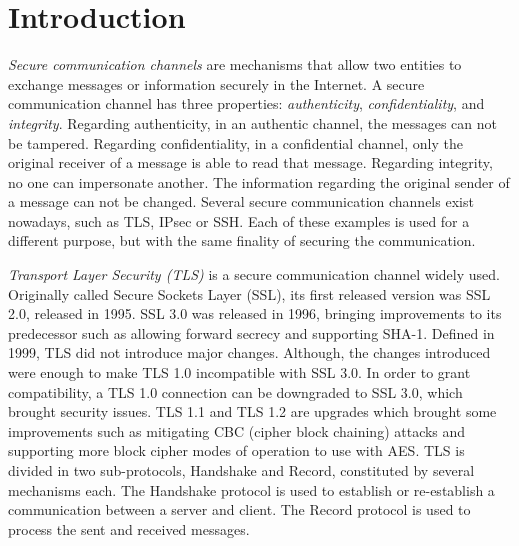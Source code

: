 \documentclass{sig-alternate-05-2015}
\begin{document}

%
%

%
%
\printccsdesc



\section{Introduction}

\textit{Secure communication channels} are mechanisms that allow two entities to exchange messages or information securely in the Internet.
A secure communication channel has three properties: \textit{authenticity}, \textit{confidentiality}, and \textit{integrity}. Regarding authenticity, in an authentic channel, the messages can not be tampered. Regarding confidentiality, in a confidential channel, only the original receiver of a message is able to read that message. Regarding integrity, no one can impersonate another. The information regarding the original sender of a message can not be changed.
Several secure communication channels exist nowadays, such as TLS, IPsec or SSH. Each of these examples is used for a different purpose, but with the same finality of securing the communication.

\textit{Transport Layer Security (TLS)} is a secure communication channel widely used. Originally called Secure Sockets Layer (SSL), its first released version was SSL 2.0, released in 1995. SSL 3.0 was released in 1996, bringing improvements to its predecessor such as allowing forward secrecy and supporting SHA-1.
Defined in 1999, TLS did not introduce major changes. Although, the changes introduced were enough to make TLS 1.0 incompatible with SSL 3.0. In order to grant compatibility, a TLS 1.0 connection can be downgraded to SSL 3.0, which brought security issues. TLS 1.1 and TLS 1.2 are upgrades which brought some improvements such as mitigating CBC (cipher block chaining) attacks and supporting more block cipher modes of operation to use with AES.
TLS is divided in two sub-protocols, Handshake and Record, constituted by several mechanisms each.
The Handshake protocol is used to establish or re-establish a communication between a server and client. The Record protocol is used to process the sent and received messages.
\end{document}
